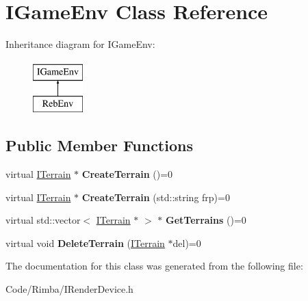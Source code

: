 \hypertarget{class_i_game_env}{}\section{I\+Game\+Env Class Reference}
\label{class_i_game_env}
Inheritance diagram for I\+Game\+Env\+:\begin{figure}[H]
\begin{center}
\leavevmode
\includegraphics[height=2.000000cm]{class_i_game_env}
\end{center}
\end{figure}
\subsection*{Public Member Functions}
\begin{DoxyCompactItemize}
\item 
virtual \hyperlink{class_i_terrain}{I\+Terrain} $\ast$ {\bfseries Create\+Terrain} ()=0\hypertarget{class_i_game_env_a0e14b7622d8a2707e6eecb86699f97ce}{}\label{class_i_game_env_a0e14b7622d8a2707e6eecb86699f97ce}

\item 
virtual \hyperlink{class_i_terrain}{I\+Terrain} $\ast$ {\bfseries Create\+Terrain} (std\+::string frp)=0\hypertarget{class_i_game_env_af375523ae99a795ef4889e47861ce391}{}\label{class_i_game_env_af375523ae99a795ef4889e47861ce391}

\item 
virtual std\+::vector$<$ \hyperlink{class_i_terrain}{I\+Terrain} $\ast$ $>$ $\ast$ {\bfseries Get\+Terrains} ()=0\hypertarget{class_i_game_env_ab917525b0b0b751924b26a98825f1681}{}\label{class_i_game_env_ab917525b0b0b751924b26a98825f1681}

\item 
virtual void {\bfseries Delete\+Terrain} (\hyperlink{class_i_terrain}{I\+Terrain} $\ast$del)=0\hypertarget{class_i_game_env_a4ef200439b989df4463c00a19064be00}{}\label{class_i_game_env_a4ef200439b989df4463c00a19064be00}

\end{DoxyCompactItemize}


The documentation for this class was generated from the following file\+:\begin{DoxyCompactItemize}
\item 
Code/\+Rimba/I\+Render\+Device.\+h\end{DoxyCompactItemize}
